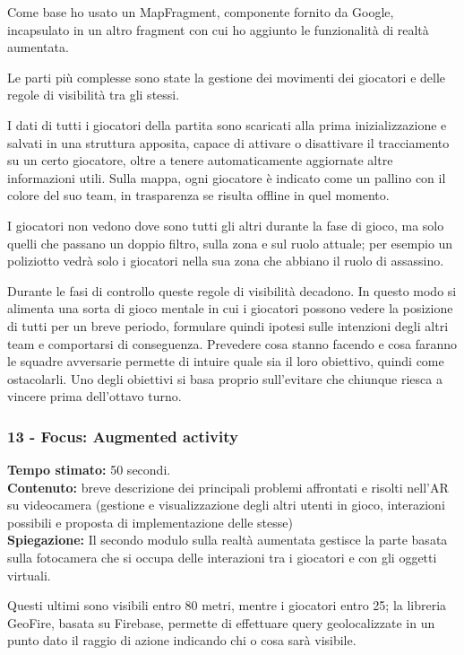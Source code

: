 \documentclass[
	twoside]				%
	{toptesi}				%
\begin{document}
	Come base ho usato un MapFragment, componente fornito da Google, incapsulato in un altro fragment con cui ho aggiunto le funzionalità di realtà aumentata.
	
	Le parti più complesse sono state la gestione dei movimenti dei giocatori e delle regole di visibilità tra gli stessi.
	
	I dati di tutti i giocatori della partita sono scaricati alla prima inizializzazione e salvati in una struttura apposita, capace di attivare o disattivare il tracciamento su un certo giocatore, oltre a tenere automaticamente aggiornate altre informazioni utili. Sulla mappa, ogni giocatore è indicato come un pallino con il colore del suo team, in trasparenza se risulta offline in quel momento.
	
	I giocatori non vedono dove sono tutti gli altri durante la fase di gioco, ma solo quelli che passano un doppio filtro, sulla zona e sul ruolo attuale; per esempio un poliziotto vedrà solo i giocatori nella sua zona che abbiano il ruolo di assassino.
	
	Durante le fasi di controllo queste regole di visibilità decadono. In questo modo si alimenta una sorta di gioco mentale in cui i giocatori possono vedere la posizione di tutti per un breve periodo, formulare quindi ipotesi sulle intenzioni degli altri team e comportarsi di conseguenza. Prevedere cosa stanno facendo e cosa faranno le squadre avversarie permette di intuire quale sia il loro obiettivo, quindi come ostacolarli. Uno degli obiettivi si basa proprio sull'evitare che chiunque riesca a vincere prima dell'ottavo turno.
	
	\subsubsection{13 - Focus: Augmented activity}
	
	\textbf{Tempo stimato:} 50 secondi. \\
	
	\textbf{Contenuto:} breve descrizione dei principali problemi affrontati e risolti nell'AR su videocamera (gestione e visualizzazione degli altri utenti in gioco, interazioni possibili e proposta di implementazione delle stesse) \\
	
	\textbf{Spiegazione:} Il secondo modulo sulla realtà aumentata gestisce la parte basata sulla fotocamera che si occupa delle interazioni tra i giocatori e con gli oggetti virtuali.
	
	Questi ultimi sono visibili entro 80 metri, mentre i giocatori entro 25; la libreria GeoFire, basata su Firebase, permette di effettuare query geolocalizzate in un punto dato il raggio di azione indicando chi o cosa sarà visibile.
	
\end{document}
